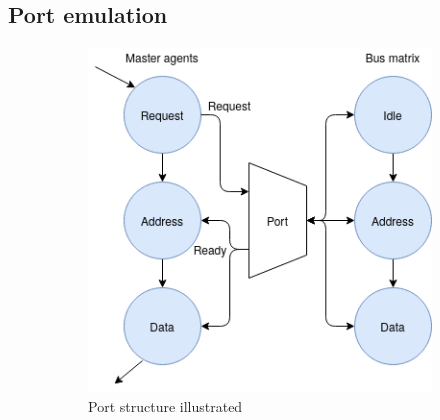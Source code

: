 \subsection{Port emulation}
\begin{figure}[hbt]
 \centering
 \begin{subfigure}[b]{0.4\linewidth}
 \includegraphics[width=\linewidth]{figs/ESL/port_em.png}
 \caption{Port structure illustrated}
 \end{subfigure}
 \begin{subfigure}[b]{0.3\linewidth}

\end{subfigure}
\end{figure}
